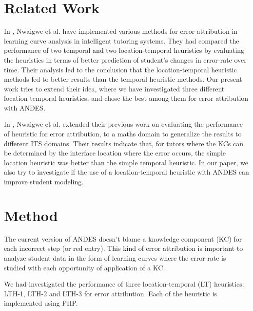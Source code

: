 \documentclass[conference]{IEEEtran}
\begin{document}
\section{Related Work}
In \cite{Nwaigwe1}, Nwaigwe et al. have implemented various methods for error attribution in learning curve analysis in intelligent tutoring systems. They had compared the performance of two temporal and two location-temporal heuristics by evaluating the heuristics in terms of better prediction of student's changes in error-rate over time. Their analysis led to the conclusion that the location-temporal heuristic methods led to better results than the temporal heuristic methods. Our present work tries to extend their idea, where we have investigated three different location-temporal heuristics, and chose the best among them for error attribution with ANDES.

In \cite{Nwaigwe2}, Nwaigwe et al. extended their previous work on evaluating the performance of heuristic for error attribution, to a maths domain to generalize the results to different ITS domains. Their results indicate that, for tutors where the KCs can be determined by the interface location where the error occurs, the simple location heuristic was better than the simple temporal heuristic. In our paper, we also try to investigate if the use of a location-temporal heuristic with ANDES can improve student modeling.

\section{Method}

The current version of ANDES doesn't blame a knowledge component (KC) for each incorrect step (or red entry). This kind of error attribution is important to analyze student data in the form of learning curves where the error-rate is studied with each opportunity of application of a KC.

We had investigated the performance of three location-temporal (LT) heuristics: LTH-1, LTH-2 and LTH-3 for error attribution. Each of the heuristic is implemented using PHP.
\end{document}
